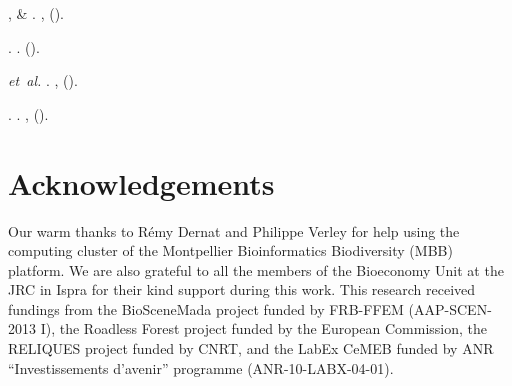 \documentclass[
  12pt,
]{article}
\begin{document}
\begin{thebibliography}{99}
,  \&
\newblock {}.
\newblock \emph{} \textbf{},
   ().

.
\newblock \emph{}.
\newblock {}
  ().

 \emph{et~al.}
\newblock {}.
\newblock \emph{} \textbf{},
   ().

.
\newblock \emph{}.
\newblock {},
   ().

\end{thebibliography}


\newpage
\linenumbers

\hypertarget{acknowledgements}{%
\section{Acknowledgements}\label{acknowledgements}}

Our warm thanks to Rémy Dernat and Philippe Verley for help using the computing cluster of the Montpellier Bioinformatics Biodiversity (MBB) platform. We are also grateful to all the members of the Bioeconomy Unit at the JRC in Ispra for their kind support during this work. This research received fundings from the BioSceneMada project funded by FRB-FFEM (AAP-SCEN-2013 I), the Roadless Forest project funded by the European Commission, the RELIQUES project funded by CNRT, and the LabEx CeMEB funded by ANR ``Investissements d'avenir'' programme (ANR-10-LABX-04-01).
\end{document}
